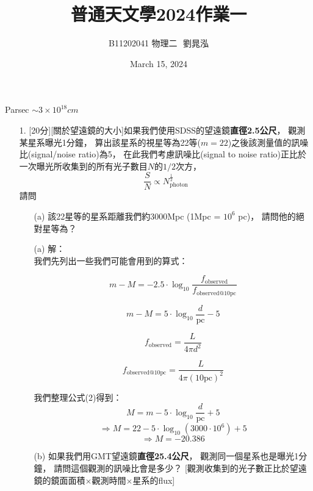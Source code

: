 \documentclass{article}
\title{普通天文學2024作業一}
\author{B11202041 物理二 $ $ 劉晁泓}
\date{March 15, 2024}
\theoremstyle{definition}
\begin{document}
\maketitle
\thispagestyle{fancy}
\renewcommand{\footrulewidth}{0.4pt}
\cfoot{\thepage}
\renewcommand{\headrulewidth}{0.4pt}

Parsec $\sim 3 \times 10^{18} cm$

\begin{enumerate}
	\item[1.] [20分][關於望遠鏡的大小]如果我們使用SDSS的望遠鏡\textbf{直徑2.5公尺}，
		觀測某星系曝光1分鐘，
		算出該星系的視星等為22等($m = 22$)之後該測量值的訊噪比(signal/noise ratio)為5，
		在此我們考慮訊噪比(signal to noise ratio)正比於一次曝光所收集到的所有光子數目$N$的$1/2$次方，
		\[
			\frac{S}{N} \propto N_{\text{photon}}^{\frac{1}{2}}
		\]
		請問\\
		\begin{enumerate}
			\item[(a)] 該22星等的星系距離我們約3000Mpc (1Mpc = $10^6$ pc)，
				請問他的絕對星等為？

			\item[(a)] 解：\\
				我們先列出一些我們可能會用到的算式：

				\begin{equation}
					m - M = -2.5 \cdot \log_{10} \frac{f_{\text{observed}}}{f_{\text{observed@10pc}}}
				\end{equation}

				\begin{equation}
					m - M = 5 \cdot \log_{10} \frac{d}{\text{pc}} - 5
				\end{equation}

				\begin{equation}
					f_{\text{observed}} = \frac{L}{4 \pi d^2}
				\end{equation}

				\begin{equation}
					f_{\text{observed@10pc}} = \frac{L}{4 \pi (10 \text{pc})^2}
				\end{equation}

				我們整理公式(2)得到：
				\[
					M = m - 5 \cdot \log_{10} \frac{d}{\text{pc}} + 5
				\]
				\[
					\Rightarrow M = 22 - 5 \cdot \log_{10} (3000 \cdot 10^6) + 5
				\]
				\[
					\Rightarrow M = -20.386
				\]

			\item[(b)] 如果我們用GMT望遠鏡\textbf{直徑25.4公尺}，
				觀測同一個星系也是曝光1分鐘，
				請問這個觀測的訊噪比會是多少？
				[觀測收集到的光子數正比於望遠鏡的鏡面面積$\times$觀測時間$\times$星系的flux]


\end{enumerate}
\end{enumerate}
\end{document}
